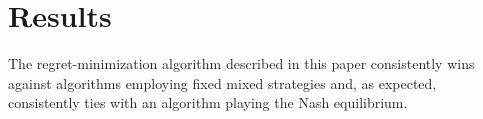 
\section{Results}
\label{sec:results}

The regret-minimization algorithm described in this paper consistently wins against algorithms employing fixed mixed strategies and, as expected, consistently ties with an algorithm playing the Nash equilibrium.







